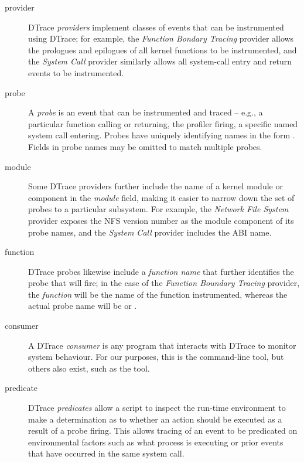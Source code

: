 \documentclass[a4paper,10pt]{article}
\begin{document}
\begin{description}
\item[provider] DTrace \textit{providers} implement classes of events that can
  be instrumented using DTrace; for example, the \textit{Function Bondary
  Tracing} provider allows the prologues and epilogues of all kernel functions
  to be instrumented, and the \textit{System Call} provider similarly allows
  all system-call entry and return events to be instrumented.

\item[probe] A \textit{probe} is an event that can be instrumented and traced
  -- e.g., a particular function calling or returning, the profiler firing, a
  specific named system call entering.
  Probes have uniquely identifying names in the form
  .
  Fields in probe names may be omitted to match multiple probes.

\item[module] Some DTrace providers further include the name of a kernel
  module or component in the \textit{module} field, making it easier to narrow
  down the set of probes to a particular subsystem.
  For example, the \textit{Network File System} provider exposes the NFS
  version number as the module component of its probe names, and the
  \textit{System Call} provider includes the ABI name.

\item[function] DTrace probes likewise include a \textit{function name} that
  further identifies the probe that will fire; in the case of the
  \textit{Function Boundary Tracing} provider, the \textit{function} will be
  the name of the function instrumented, whereas the actual probe name will be
   or .

\item[consumer] A DTrace \textit{consumer} is any program that interacts with
  DTrace to monitor system behaviour.
  For our purposes, this is the  command-line tool, but others
  also exist, such as the  tool.

\item[predicate] DTrace \textit{predicates} allow a script to inspect the
  run-time environment to make a determination as to whether an action should
  be executed as a result of a probe firing.
  This allows tracing of an event to be predicated on environmental factors
  such as what process is executing or prior events that have occurred in the
  same system call.


\end{description}
\end{document}
